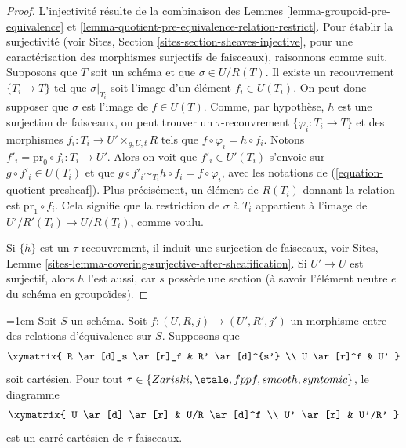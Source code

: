\begin{proof}
L'injectivité résulte de la combinaison des
Lemmes \ref{lemma-groupoid-pre-equivalence} et
\ref{lemma-quotient-pre-equivalence-relation-restrict}.
Pour établir la surjectivité (voir
Sites, Section \ref{sites-section-sheaves-injective},
pour une caractérisation des morphismes surjectifs de faisceaux), raisonnons comme suit.
Supposons que $T$ soit un schéma et que $\sigma \in U/R(T)$.
Il existe un recouvrement $\{T_i \to T\}$ tel que $\sigma|_{T_i}$
soit l'image d'un élément $f_i \in U(T_i)$. On peut donc
supposer que $\sigma$ est l'image de $f \in U(T)$.
Comme, par hypothèse, $h$ est une surjection de faisceaux, on
peut trouver un $\tau$-recouvrement $\{\varphi_i : T_i \to T\}$ et des morphismes
$f_i : T_i \to U' \times_{g, U, t} R$ tels que
$f \circ \varphi_i = h \circ f_i$. Notons
$f'_i = \text{pr}_0 \circ f_i : T_i \to U'$. Alors on voit que
$f'_i \in U'(T_i)$ s'envoie sur $g \circ f'_i \in U(T_i)$ et
que $g \circ f'_i \sim_{T_i} h \circ f_i = f \circ \varphi_i$,
avec les notations de (\ref{equation-quotient-presheaf}). Plus précisément, un
élément de $R(T_i)$ donnant la relation est $\text{pr}_1 \circ f_i$.
Cela signifie que la restriction
de $\sigma$ à $T_i$ appartient à l'image de $U'/R'(T_i) \to U/R(T_i)$,
comme voulu.

\medskip\noindent
Si $\{h\}$ est un $\tau$-recouvrement, il induit une surjection de faisceaux, voir
Sites, Lemme \ref{sites-lemma-covering-surjective-after-sheafification}.
Si $U' \to U$ est surjectif, alors $h$ l'est aussi, car $s$ possède une section
(à savoir l'élément neutre $e$ du schéma en groupoïdes).
\end{proof}

\begin{lemma}\emergencystretch=1em
\label{lemma-criterion-fibre-product}
Soit $S$ un schéma. Soit $f : (U, R, j) \to (U', R', j')$ un morphisme
entre des relations d'équivalence sur $S$. Supposons que
$$
\xymatrix{
R \ar[d]_s \ar[r]_f & R' \ar[d]^{s'} \\
U \ar[r]^f & U'
}
$$
soit cartésien. Pour tout
$\tau \in\allowbreak \{Zariski,\allowbreak \etale,\allowbreak fppf,\allowbreak smooth,\allowbreak syntomic\}$,
le diagramme
$$
\xymatrix{
U \ar[d] \ar[r] & U/R \ar[d]^f \\
U' \ar[r] & U'/R'
}
$$
est un carré cartésien de $\tau$-faisceaux.
\end{lemma}

